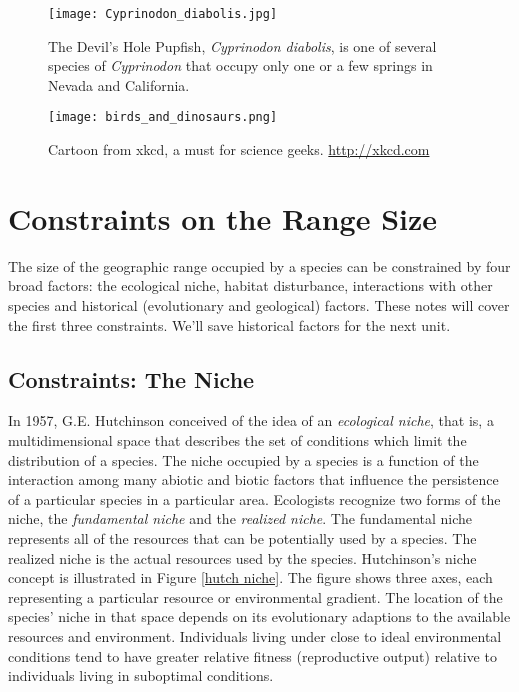 \documentclass[12pt, oneside]{article}   	%
\begin{document}
\begin{figure}[htb]
	\centering
		\texttt{[image: Cyprinodon\_diabolis.jpg]}  
		\caption{The Devil's Hole Pupfish, \emph{Cyprinodon diabolis}, is one of several species of \emph{Cyprinodon} that occupy only one or a few springs in Nevada and California.\label{cdiabolis}}
		
\end{figure}


\begin{figure}
	\centering
	\texttt{[image: birds\_and\_dinosaurs.png]}
	\caption{Cartoon from xkcd, a must for science geeks.\label{xkcd} \url{http://xkcd.com}}
\end{figure}

\section{Constraints on the Range Size}

The size of the geographic range occupied by a species can be constrained by four broad factors: the ecological niche, habitat disturbance, interactions with other species and historical (evolutionary and geological) factors.  These notes will cover the first three constraints. We'll save historical factors for the next unit.


\subsection{Constraints: The Niche}

In 1957, G.E. Hutchinson conceived of the idea of an \emph{ecological niche}, that is, a multidimensional space that describes the set of conditions which limit the distribution of a species.  The niche occupied by a species is a function of the interaction among many abiotic and biotic factors that influence the persistence of a particular species in a particular area.  Ecologists recognize two forms of the niche, the \emph{fundamental niche} and the \emph{realized niche}. The fundamental niche represents all of the resources that can be potentially used by a species.  The realized niche is the actual resources used by the species. Hutchinson's niche concept is illustrated in Figure \ref{hutch niche}.  The figure shows three axes, each representing a particular resource or environmental gradient.  The location of the species' niche in that space depends on its evolutionary adaptions to the available resources and environment.  Individuals living under close to ideal environmental conditions tend to have greater relative fitness (reproductive output) relative to individuals living in suboptimal conditions.
\end{document}
